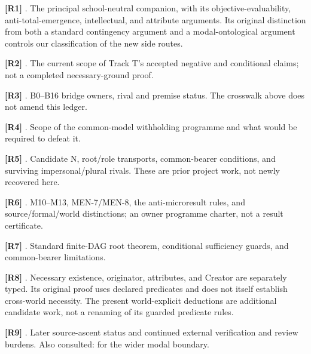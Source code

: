 \documentclass[11pt,a4paper]{article}
\begin{document}
\textbf{{[}R1{]}}
. The
principal school-neutral companion, with its objective-evaluability,
anti-total-emergence, intellectual, and attribute arguments. Its
original distinction from both a standard contingency argument and a
modal-ontological argument controls our classification of the new side
routes.

\textbf{{[}R2{]}}
.
The current scope of Track T's accepted negative and conditional claims;
not a completed necessary-ground proof.

\textbf{{[}R3{]}}
.
B0--B16 bridge owners, rival and premise status. The crosswalk above
does not amend this ledger.

\textbf{{[}R4{]}}
.
Scope of the common-model withholding programme and what would be
required to defeat it.

\textbf{{[}R5{]}}
.
Candidate N, root/role transports, common-bearer conditions, and
surviving impersonal/plural rivals. These are prior project work, not
newly recovered here.

\textbf{{[}R6{]}}
.
M10--M13, MEN-7/MEN-8, the anti-microresult rules, and
source/formal/world distinctions; an owner programme charter, not a
result certificate.

\textbf{{[}R7{]}}
.
Standard finite-DAG root theorem, conditional sufficiency guards, and
common-bearer limitations.

\textbf{{[}R8{]}}
.
Necessary existence, originator, attributes, and Creator are separately
typed. Its original proof uses declared predicates and does not itself
establish cross-world necessity. The present world-explicit deductions
are additional candidate work, not a renaming of its guarded predicate
rules.

\textbf{{[}R9{]}}
.
Later source-ascent status and continued external verification and
review burdens. Also consulted:
 for the wider
modal boundary.
\end{document}
